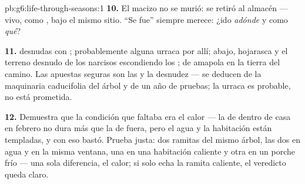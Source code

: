 \begin{solution}{pb:g6:life-through-seasons:1}
\textbf{10.} El macizo no se murió: se retiró al almacén --- vivo,
como , bajo el mismo sitio. ``Se fue'' siempre merece: ¿ido
\emph{adónde} y como \emph{qué}?

\textbf{11.}  desnudas con ; probablemente alguna urraca por
allí; abajo, hojarasca y el terreno desnudo de los narcisos escondiendo
los ;  de amapola en la tierra del camino. Las apuestas
seguras son las  y la desnudez --- se deducen de la maquinaria
caducifolia del árbol y de un año de pruebas; la urraca es probable, no
está prometida.

\textbf{12.} Demuestra que la condición que faltaba era el calor ---
la  de dentro de casa en febrero no dura más que la de fuera, pero
el agua y la habitación están templadas, y con eso bastó. Prueba justa:
dos ramitas del mismo árbol, las dos en agua y en la misma ventana, una
en una habitación caliente y otra en un porche frío --- una sola
diferencia, el calor; si solo echa  la ramita caliente, el
veredicto queda claro.
\end{solution}
